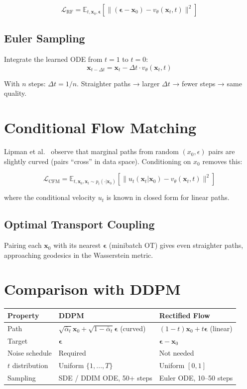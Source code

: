 \documentclass[11pt, a4paper]{article}
\theoremstyle{definition}
\newcommand{\bx}{\bm{x}}
\newcommand{\bepsilon}{\bm{\epsilon}}
\begin{document}
\begin{equation}
  \boxed{\mathcal{L}_\text{RF} = \mathbb{E}_{t, \bx_0, \bepsilon}\!\left[\|(\bepsilon - \bx_0) - v_\theta(\bx_t, t)\|^2\right]}
\end{equation}

\subsection{Euler Sampling}

Integrate the learned ODE from $t=1$ to $t=0$:
\begin{equation}
  \bx_{t - \Delta t} = \bx_t - \Delta t \cdot v_\theta(\bx_t, t)
\end{equation}

With $n$ steps: $\Delta t = 1/n$. Straighter paths → larger $\Delta t$ → fewer steps → same quality.

\section{Conditional Flow Matching}

Lipman et al.~\cite{lipman2022fm} observe that marginal paths from random $(x_0, \epsilon)$ pairs are
slightly curved (pairs ``cross'' in data space). Conditioning on $x_0$ removes this:

\begin{equation}
  \mathcal{L}_\text{CFM} = \mathbb{E}_{t, \bx_0, \bx_t \sim p_t(\cdot|\bx_0)}\!\left[\|u_t(\bx_t | \bx_0) - v_\theta(\bx_t, t)\|^2\right]
  \label{eq:cfm}
\end{equation}

where the conditional velocity $u_t$ is known in closed form for linear paths.

\subsection{Optimal Transport Coupling}

Pairing each $\bx_0$ with its nearest $\bepsilon$ (minibatch OT) gives even straighter paths,
approaching geodesics in the Wasserstein metric.

\section{Comparison with DDPM}

\begin{center}
\begin{tabular}{lll}
\toprule
Property & DDPM & Rectified Flow \\
\midrule
Path & $\sqrt{\bar\alpha_t}\bx_0 + \sqrt{1-\bar\alpha_t}\bepsilon$ (curved) & $(1-t)\bx_0 + t\bepsilon$ (linear) \\
Target & $\bepsilon$ & $\bepsilon - \bx_0$ \\
Noise schedule & Required & Not needed \\
$t$ distribution & Uniform $\{1,...,T\}$ & Uniform $[0,1]$ \\
Sampling & SDE / DDIM ODE, 50+ steps & Euler ODE, 10–50 steps \\
\bottomrule
\end{tabular}
\end{center}
\end{document}
